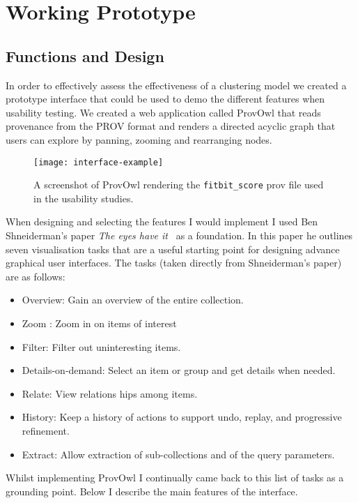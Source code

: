 \chapter{Working Prototype}

\section{Functions and Design}

In order to effectively assess the effectiveness of a clustering model we created a prototype interface that could be used to demo the different features when usability testing. We created a web application called ProvOwl that reads provenance from the PROV format and renders a directed acyclic graph that users can explore by panning, zooming and rearranging nodes.

\begin{figure}[h]
\centering
\texttt{[image: interface-example]}
\caption{A screenshot of ProvOwl rendering the \texttt{fitbit\_score} prov file used in the usability studies.}
\label{fig:interface-example}
\end{figure}

When designing and selecting the features I would implement I used Ben Shneiderman's paper \textit{The eyes have it}~\cite{Shneiderman1996} as a foundation. In this paper he outlines seven visualisation tasks that are a useful starting point for designing advance graphical user interfaces. The tasks (taken directly from Shneiderman's paper) are as follows:

\begin{itemize}
\item Overview: Gain an overview of the entire collection. 
\item Zoom : Zoom in on items of interest 
\item Filter: Filter out uninteresting items. 
\item Details-on-demand: Select an item or group and get details when needed.
\item Relate: View relations hips among items. 
\item History: Keep a history of actions to support undo, replay, and progressive refinement.
\item Extract: Allow extraction of sub-collections and of the query parameters. 
\end{itemize}

Whilst implementing ProvOwl I continually came back to this list of tasks as a grounding point. Below I describe the main features of the interface. 

